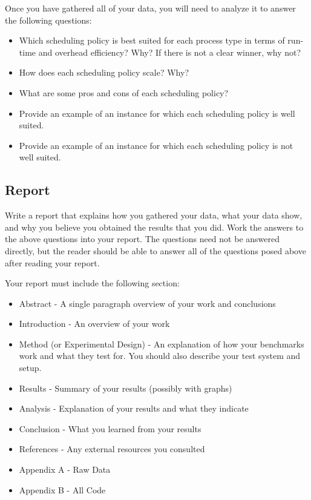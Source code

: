 \documentclass[12pt]{article}
\begin{document}
Once you have gathered all of your data, you will need to analyze it
to answer the following questions:

\begin{itemize}
\item Which scheduling policy is best suited for each process type in
  terms of run-time and overhead efficiency?
  Why? If there is not a clear winner, why not?
\item How does each scheduling policy scale? Why?
\item What are some pros and cons of each scheduling policy?
\item Provide an example of an instance for which each scheduling
  policy is well suited.
\item Provide an example of an instance for which each scheduling
  policy is not well suited.
\end{itemize}

\subsection{Report}

Write a report that explains how you gathered your data, what your
data show, and why you believe you obtained the results that you did. Work
the answers to the above questions into your report. The questions
need not be answered directly, but the reader should be able to answer
all of the questions posed above after reading your report.

Your report must include the following section:

\begin{itemize}
\item Abstract - A single paragraph overview of your work and conclusions
\item Introduction - An overview of your work
\item Method (or Experimental Design) - An explanation of how your
benchmarks work and what they test for. You should also describe your
test system and setup.
\item Results - Summary of your results (possibly with graphs)
\item Analysis - Explanation of your results and what they indicate
\item Conclusion - What you learned from your results
\item References - Any external resources you consulted
\item Appendix A - Raw Data
\item Appendix B - All Code
\end{itemize}
\end{document}
